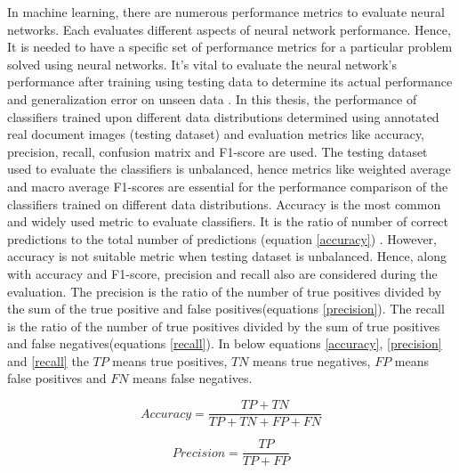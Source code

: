 In machine learning, there are numerous performance metrics to evaluate neural networks. Each evaluates different aspects of neural network performance. Hence, It is needed to have a specific set of performance metrics for a particular problem solved using neural networks. It's vital to evaluate the neural network's performance after training using testing data to determine its actual performance and generalization error on unseen data \cite{powers2020evaluation}. In this thesis, the performance of classifiers trained upon different data distributions determined using annotated real document images (testing dataset) and evaluation metrics like accuracy, precision, recall, confusion matrix and F1-score are used. The testing dataset used to evaluate the classifiers is unbalanced, hence metrics like weighted average and macro average F1-scores are essential for the performance comparison of the classifiers trained on different data distributions. Accuracy is the most common and widely used metric to evaluate classifiers. It is the ratio of number of correct predictions to the total number of predictions (equation \ref{accuracy}) \cite{vakili2020performance}. However, accuracy is not suitable metric when testing dataset is unbalanced. Hence, along with accuracy and F1-score, precision and recall also are considered during the evaluation. The precision is the ratio of the number of true positives divided by the sum of the true positive and false positives\footnotemark (equations \ref{precision}). The recall is the ratio of the number of true positives divided by the sum of true positives and false negatives\footnotemark[\value{footnote}] (equations \ref{recall}). In below equations \ref{accuracy}, \ref{precision} and \ref{recall} the $TP$ means true positives, $TN$ means true negatives, $FP$ means false positives and $FN$ means false negatives.


\begin{equation}\label{accuracy}
\textit{Accuracy} = \frac{TP + TN}{TP +TN+ FP + FN}
\end{equation}

\begin{equation}\label{precision}
\textit{Precision} = \frac{TP}{TP + FP}
\end{equation}

